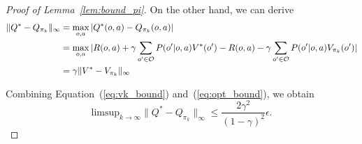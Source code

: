 \begin{proof}[Proof of Lemma~\ref{lem:bound_pi}]
On the other hand, we can derive
\begin{align}
    \| Q^* - Q_{\pi_k} \|_\infty &= \max_{o,a} |Q^*(o,a) - Q_{\pi_k}(o,a) | \\
    &= \max_{o,a} |R(o,a) + \gamma \sum_{o^\prime\in\mathcal{O}}P(o^\prime|o,a)V^*(o^\prime) - R(o,a) - \gamma \sum_{o^\prime\in\mathcal{O}}P(o^\prime|o,a)V_{\pi_k}(o^\prime) | \\
    &= \gamma \|V^* - V_{\pi_k} \|_\infty \label{eq:opt_bound}
\end{align}

Combining Equation~(\ref{eq:vk_bound}) and~(\ref{eq:opt_bound}), we obtain
\begin{equation}
    \mathrm{limsup}_{k\to\infty} \|Q^* - Q_{\pi_k} \|_\infty \leq \frac{2\gamma^2}{(1-\gamma)^2} \epsilon.
\end{equation}

\end{proof}

